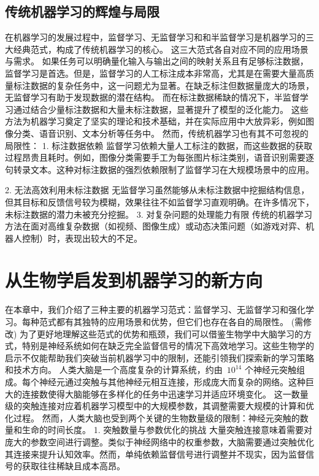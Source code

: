 \subsection{传统机器学习的辉煌与局限}

在机器学习的发展过程中，监督学习、无监督学习和和半监督学习是机器学习的三大经典范式，构成了传统机器学习的核心。
这三大范式各自对应不同的应用场景与需求。
如果任务可以明确量化输入与输出之间的映射关系且有足够标注数据，监督学习是首选。但是，监督学习的人工标注成本非常高，尤其是在需要大量高质量标注数据的复杂任务中，这一问题尤为显著。在缺乏标注但数据量庞大的场景，无监督学习有助于发现数据的潜在结构。
而在标注数据稀缺的情况下，半监督学习通过结合少量标注数据和大量未标注数据，显著提升了模型的泛化能力。
这些方法为机器学习奠定了坚实的理论和技术基础，并在实际应用中大放异彩，例如图像分类、语音识别、文本分析等任务中。
然而，传统机器学习也有其不可忽视的局限性：
1. 标注数据依赖
监督学习依赖大量人工标注的数据，而这些数据的获取过程昂贵且耗时。例如，图像分类需要手工为每张图片标注类别，语音识别需要逐句转录文本。这种对标注数据的强烈依赖限制了监督学习在大规模场景中的应用。

2. 无法高效利用未标注数据
无监督学习虽然能够从未标注数据中挖掘结构信息，但其目标和反馈信号较为模糊，效果往往不如监督学习直观明确。在许多情况下，未标注数据的潜力未被充分挖掘。
3. 对复杂问题的处理能力有限
传统的机器学习方法在面对高维复杂数据（如视频、图像生成）或动态决策问题（如游戏对弈、机器人控制）时，表现出较大的不足。
\section{从生物学启发到机器学习的新方向}

在本章中，我们介绍了三种主要的机器学习范式：监督学习、无监督学习和强化学习。每种范式都有其独特的应用场景和优势，但它们也存在各自的局限性。
 (需修改) 为了更好地理解这些范式的优势和瓶颈，我们可以借鉴生物学中大脑学习的方式，特别是神经系统如何在缺乏完全监督信号的情况下高效地学习。这些生物学的启示不仅能帮助我们突破当前机器学习中的限制，还能引领我们探索新的学习策略和技术方向。
人类大脑是一个高度复杂的计算系统，约由~${10}^{14}$  个神经元突触组成。每个神经元通过突触与其他神经元相互连接，形成庞大而复杂的网络。这种巨大的连接数使得大脑能够在多样化的任务中迅速学习并适应环境变化。
这一数量级的突触连接对应着机器学习模型中的大规模参数，其调整需要大规模的计算和优化过程。
然而，人类大脑也受到两个关键的生物数量级的限制：神经元突触的数量和生命的时间长度。%
1. 突触数量与参数优化的挑战
大量突触连接意味着需要对庞大的参数空间进行调整。类似于神经网络中的权重参数，大脑需要通过突触优化其连接来提升认知效率。然而，单纯依赖监督信号进行调整并不现实，因为监督信号的获取往往稀缺且成本高昂。

